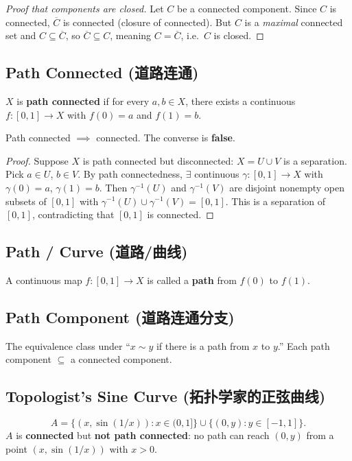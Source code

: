 \documentclass{article}
\begin{document}
\begin{proof}[Proof that components are closed]
  Let $C$ be a connected component. Since $C$ is connected,
  $\overline{C}$ is connected
  (closure of connected). But $C$ is a \emph{maximal} connected set
  and $C \subseteq \overline{C}$,
  so $\overline{C} \subseteq C$, meaning $C = \overline{C}$,
  i.e.\ $C$ is closed.
\end{proof}

\subsection{Path Connected (道路连通)}\label{def:path-connected}
\begin{definition}
  $X$ is \textbf{path connected} if for every $a, b \in X$, there
  exists a continuous $f : [0, 1] \to X$ with $f(0) = a$ and $f(1) = b$.
\end{definition}

\begin{proposition}
  Path connected $\implies$ connected. The converse is \textbf{false}.
\end{proposition}
\begin{proof}
  Suppose $X$ is path connected but disconnected: $X = U \cup V$ is a
  separation.
  Pick $a \in U$, $b \in V$. By path connectedness, $\exists$
  continuous $\gamma : [0,1] \to X$
  with $\gamma(0) = a$, $\gamma(1) = b$. Then $\gamma^{-1}(U)$ and
  $\gamma^{-1}(V)$ are disjoint
  nonempty open subsets of $[0,1]$ with $\gamma^{-1}(U) \cup
  \gamma^{-1}(V) = [0,1]$.
  This is a separation of $[0,1]$, contradicting that $[0,1]$ is connected.
\end{proof}

\subsection{Path / Curve (道路/曲线)}\label{def:path}
A continuous map $f : [0, 1] \to X$ is called a \textbf{path} from
$f(0)$ to $f(1)$.

\subsection{Path Component (道路连通分支)}\label{def:path-component}
The equivalence class under ``$x \sim y$ if there is a path from $x$ to $y$.''
Each path component $\subseteq$ a connected component.

\subsection{Topologist's Sine Curve (拓扑学家的正弦曲线)}\label{def:sine-curve}
\[
  A = \{(x, \sin(1/x)) : x \in (0, 1]\} \cup \{(0, y) : y \in [-1, 1]\}.
\]
$A$ is \textbf{connected} but \textbf{not path connected}: no path
can reach $(0, y)$ from a point $(x, \sin(1/x))$ with $x > 0$.
\end{document}
